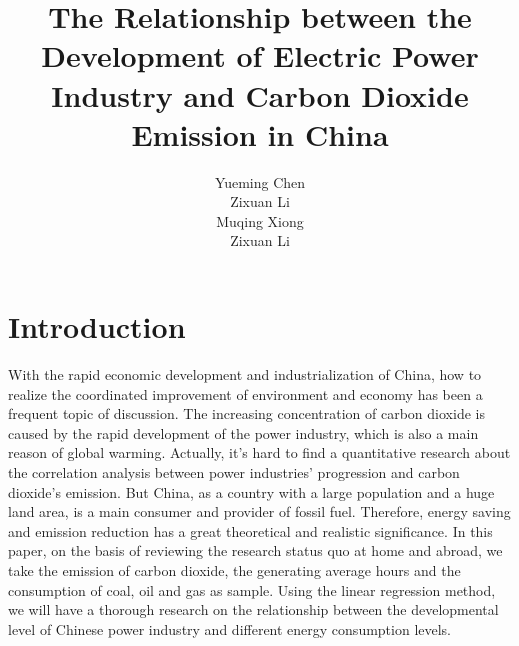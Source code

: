 \documentclass{article}
\title{The Relationship between the Development of Electric Power Industry and Carbon Dioxide Emission in China}
\author{Yueming Chen\\Zixuan Li\\Muqing Xiong\\Zixuan Li}
\begin{document}
  \maketitle
  \section{Introduction} With the rapid economic development and industrialization of China, how to realize the coordinated improvement of environment and economy has been a frequent topic of discussion. The increasing concentration of carbon dioxide is caused by the rapid development of the power industry, which is also a main reason of global warming. Actually, it’s hard to find a quantitative research about the correlation analysis between power industries’ progression and carbon dioxide’s emission. But China, as a country with a large population and a huge land area, is a main consumer and provider of fossil fuel. Therefore, energy saving and emission reduction has a great theoretical and realistic significance.
In this paper, on the basis of reviewing the research status quo at home and abroad, we take the emission of carbon dioxide, the generating average hours and the consumption of coal, oil and gas as sample. Using the linear regression method, we will have a thorough research on the relationship between the developmental level of Chinese power industry and different energy consumption levels.
\end{document}
